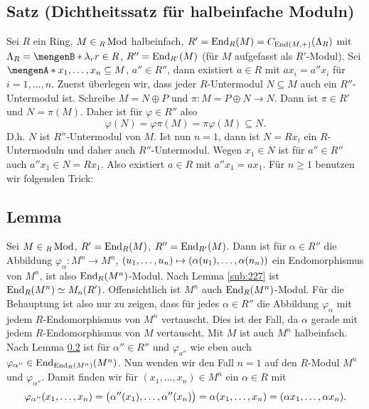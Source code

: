 \subsection{Satz (Dichtheitssatz für halbeinfache Moduln)} %
\label{sub:319}
Sei $R$ ein Ring, $M \in {_R\Mod}$ halbeinfach, $R' = \End_R (M) = C_{\End (M,+)} (\Lambda_R)$ mit $\Lambda_R = \set[\lambda_r]{r \in R} $, $R'' = \End_{R'} (M)$  
(für $M$ aufgefasst als $R'$-Modul). Sei $\set{x_1, \ldots , x_n} \subseteq M$,
$a'' \in R''$, dann existiert $a \in R$ mit $a x_i = a'' x_i$ für $i=1, \ldots ,n$.
Zuerst überlegen wir, dass jeder $R$-Untermodul $N \subseteq M$ auch ein $R''$-Untermodul ist. Schreibe $M= N \oplus P$ und $\pi : M = P \oplus N \to N$. Dann ist
$\pi \in R'$ und $N = \pi(M)$. Daher ist für $\varphi \in R''$ also 
\[
	\varphi(N)= \varphi \pi (M) = \pi  \varphi(M) \subseteq N.
\]
D.h. $N$ ist $R''$-Untermodul von $M$. Ist nun $n=1$, dann ist $N= R x_i$ ein $R$-Untermoduln und daher auch $R''$-Untermodul. Wegen $x_1 \in N$ ist für $a'' \in R''$
auch $a'' x_1 \in N= R x_1$. Also existiert $a \in R$ mit $a'' x_1 = a x_1$. Für $n\ge 1$ benutzen wir folgenden Trick:

\subsection{Lemma} %
\label{sub:320}
Sei $M \in {_R\Mod}$, $R' = \End_R(M)$, $R'' = \End_{R'}(M)$. Dann ist für $\alpha \in R''$ die Abbildung $\varphi_\alpha : M^n  \to M^n$, 
$(u_1, \ldots ,u_n)  \mapsto \enbrace*{\alpha(u_1), \ldots , \alpha(n_n)} $ ein Endomorphismus von $M^n$, ist also $\End_R(M^n)$-Modul.
Nach Lemma \ref{sub:227} ist $\End_R(M^n) \simeq M_n(R')$. Offensichtlich ist $M^n$ auch $\End_R(M^n)$-Modul. Für die Behauptung ist also nur zu zeigen, dass für jedes 
$\alpha \in R''$ die Abbildung $\varphi_\alpha$ mit jedem $R$-Endomorphismus von $M^n$ vertauscht. Dies ist der Fall, da $\alpha$ gerade mit jedem $R$-Endomorphismus von 
$M$ vertauscht. \bewende
{}
Mit $M$ ist auch $M^n$ halbeinfach. Nach Lemma \ref{sub:320} ist für $\alpha'' \in R''$ und $\varphi_{a''}$ wie eben auch $\varphi_{\alpha''} \in \End_{\End_R(M^n)} (M^n)$.
Nun wenden wir den Fall $n=1$ auf den $R$-Modul $M^n$ und $\varphi_{\alpha''}$. Damit finden wir für $(x_1, \ldots , x_n) \in M^n$ ein $\alpha \in R$ mit 
\[
	\varphi_{\alpha''}(x_1, \ldots , x_n)= \enbrace[\big]{\alpha''(x_1), \ldots , \alpha''(x_n)} = \alpha (x_1, \ldots , x_n) = (\alpha x_1, \ldots , \alpha x_n).
\]

